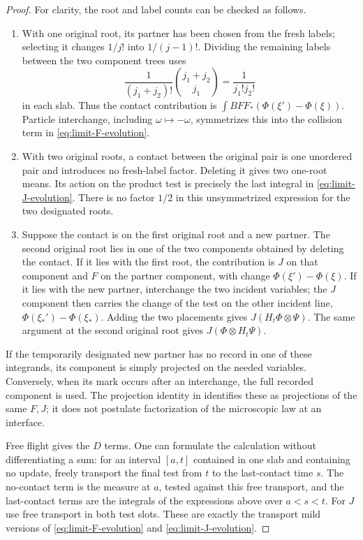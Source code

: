\begin{proof}
For clarity, the root and label counts can be checked as follows.
\begin{enumerate}[label=\textup{(\alph*)}]
\item With one original root, its partner has been chosen from the
fresh labels; selecting it changes \(1/j!\) into \(1/(j-1)!\).
Dividing the remaining labels between the two component trees uses
\[
 \frac1{(j_1+j_2)!}\binom{j_1+j_2}{j_1}
                         =\frac1{j_1!j_2!}
\]
in each slab.  Thus the contact contribution is
\(\int BFF_*(\Phi(\xi')-\Phi(\xi))\).  Particle interchange,
including \(\omega\mapsto-\omega\), symmetrizes this into the
collision term in \eqref{eq:limit-F-evolution}.
\item With two original roots, a contact between the original pair
is one unordered pair and introduces no fresh-label factor.
Deleting it gives two one-root means.  Its action on the product
test is precisely the last integral in
\eqref{eq:limit-J-evolution}.  There is no factor \(1/2\) in this
unsymmetrized expression for the two designated roots.
\item Suppose the contact is on the first original root and a
new partner.  The second original root lies in one of the two
components obtained by deleting the contact.  If it lies with the
first root, the contribution is \(J\) on that component and \(F\)
on the partner component, with change
\(\Phi(\xi')-\Phi(\xi)\).  If it lies with the new partner, interchange
the two incident variables; the \(J\) component then carries the
change of the test on the other incident line,
\(\Phi(\xi_*')-\Phi(\xi_*)\).  Adding the two placements gives
\(J(H_t\Phi\otimes\Psi)\).  The same argument at the second
original root gives \(J(\Phi\otimes H_t\Psi)\).
\end{enumerate}
If the temporarily designated new partner has no record in one of
these integrands, its component is simply projected on the needed
variables.  Conversely, when its mark occurs after an interchange,
the full recorded component is used.  The projection identity in
identifies these as projections of the same \(F,J\); it does not
postulate factorization of the microscopic law at an interface.

Free flight gives the \(D\) terms.  One can formulate the calculation
without differentiating a sum: for an interval \([a,t]\) contained
in one slab and containing no update, freely transport the final
test from \(t\) to the last-contact time \(s\).  The no-contact term
is the measure at \(a\), tested against this free transport, and the
last-contact terms are the integrals of the expressions above over
\(a<s<t\).  For \(J\) use free transport in both test slots.
These are exactly the transport mild versions of
\eqref{eq:limit-F-evolution} and \eqref{eq:limit-J-evolution}.


\end{proof}
